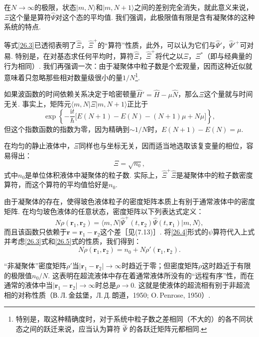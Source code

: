 在$N\to\infty$的极限，状态$\vert m,N\rangle$和$\vert m,N+1\rangle$之间的差别完全消失，就此意义来说，$\Xi$这个量是算符$\hat{\Psi}$对这个态的平均值. 我们强调，此极限值有限是含有凝聚体的这种系统的特点.

等式\eqref{26.3}已透彻表明了$\hat{\Xi}$，$\hat{\Xi}^{+}$的“算符”性质，此外，可以认为它们与$\hat{\Psi}'$，$\hat{\Psi}'^{+}$可对易. 特别是，在对基态求任何平均时，算符$\hat{\Xi}$，$\hat{\Xi}^{+}$将代之以$\Xi$，$\Xi^{*}$（即与经典量的行为相同）. 我们再强调一次：由于凝聚体中粒子数是个宏观量，因而这种近似就意味着只忽略那些相对数量级很小的量$1/N$\footnote{特别是，取这种精确度时，对于系统中粒子数之差相同（不大的）的各不同状态之间的跃迁来说，应当认为算符 $\hat{\Psi}$ 的各跃迁矩阵元都相同.}.

如果波函数的时间依赖关系决定于哈密顿量$\hat{H}'=\hat{H}-\mu\hat{N}$，那么$\Xi$这个量就与时间无关. 事实上，矩阵元$\langle m,N\vert\Xi\vert m,N+1\rangle$正比于
\begin{equation*}
\exp\left\{-\frac{\mathrm{i}t}{\hbar}
\bigl[E(N+1)-E(N)-(N+1)\mu+N\mu\bigr]\right\},
\end{equation*}
但这个指数函数的指数为零，因为精确到$\sim 1/N$时，$E(N+1)-E(N)=\mu$.

在均匀的静止液体中，$\Xi$同样也与坐标无关，因而适当地选取该复变量的相位，容易得出：
\begin{equation}
\Xi=\sqrt{n_{0}},
\label{26.6}
\end{equation}
式中$n_{0}$是单位体积液体中凝聚体的粒子数. 实际上，$\hat{\Xi}^{+}\hat{\Xi}$是凝聚体中的粒子数密度算符，而这个算符的平均值恰好是$n_{0}$.

由于凝聚体的存在，使得玻色液体粒子的密度矩阵本质上有别于通常液体中的密度矩阵. 在均匀玻色液体的任意状态，密度矩阵以下列表达式定义：
\begin{equation}
N\rho(\bm{r}_{1},\bm{r}_{2})
=\langle m,N\vert\hat{\Psi}^{+}(t,\bm{r}_{2})\hat{\Psi}(t,\bm{r}_{1})\vert m,N\rangle,
\label{26.7}
\end{equation}
而且该函数只依赖于$\bm{r}=\bm{r}_{1}-\bm{r}_{2}$这个差［见(7.13)］. 将\eqref{26.4}形式的$\psi$算符代入上式并考虑\eqref{26.3}式和\eqref{26.5}式的性质，我们得到：
\begin{equation}
N\rho(\bm{r}_{1},\bm{r}_{2})=n_{0}+N\rho'(\bm{r}_{1},\bm{r}_{2}).
\label{26.8}
\end{equation}

“非凝聚体”密度矩阵$\rho'$当$\vert\bm{r}_{1}-\bm{r}_{2}\vert\to\infty$时趋近于零；但密度矩阵$\rho$这时趋近于有限的极限值$n_{0}/N$. 这表明在超流液体中存在着通常液体所没有的“远程有序”性，而在通常的液体中当$\vert\bm{r}_{1}-\bm{r}_{2}\vert\to\infty$时总是$\rho\to 0$. 这就是使液体的超流相有别于非超流相的对称性质（В.\,Л.\,金兹堡，Л.\,Д.\,朗道，1950; O.\,Penrose, 1950）.

